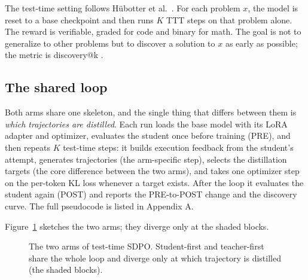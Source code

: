 \documentclass[12pt,a4paper]{report}
\begin{document}
The test-time setting follows Hübotter et al.~\cite{r1}. For each problem \(x\), the model is reset to a base checkpoint and then runs \(K\) TTT steps on that problem alone. The reward is verifiable, graded for code and binary for math. The goal is not to generalize to other problems but to discover a solution to \(x\) as early as possible; the metric is discovery@k \cite{r1}.

\subsection{The shared loop}\label{the-shared-loop}

Both arms share one skeleton, and the single thing that differs between them is \emph{which trajectories are distilled}. Each run loads the base model with its LoRA adapter and optimizer, evaluates the student once before training (PRE), and then repeats \(K\) test-time steps: it builds execution feedback from the student's attempt, generates trajectories (the arm-specific step), selects the distillation targets (the core difference between the two arms), and takes one optimizer step on the per-token KL loss whenever a target exists. After the loop it evaluates the student again (POST) and reports the PRE-to-POST change and the discovery curve. The full pseudocode is listed in Appendix A.

Figure~\ref{fig:two-arms} sketches the two arms; they diverge only at the shaded blocks.

\begin{figure}[H]
\centering
{}
\caption{The two arms of test-time SDPO. Student-first and teacher-first share the whole loop and diverge only at which trajectory is distilled (the shaded blocks).}
\label{fig:two-arms}
\end{figure}
\end{document}
